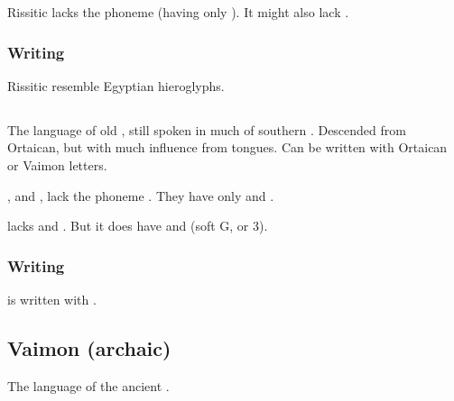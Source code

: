 Rissitic lacks the phoneme \txipa{[x]} (having only \txipa{[\c c]}). 
It might also lack \txipa{[l]}. 










\subsubsection{Writing}
Rissitic  resemble Egyptian hieroglyphs. 









\subsection{\Tepharin}
The language of old \Tephar, still spoken in much of southern \Velcad. 
Descended from Ortaican, but with much influence from \human{} tongues. 
Can be written with Ortaican or Vaimon letters. 

\Tepharin, and \Ortaican, lack the phoneme \txipa{[v]}. 
They have only \txipa{[w]} and \txipa{[hw]}. 

\Tepharin{} lacks \txipa{[z]} and \txipa{[S]}.
But it does have \txipa{[D]} and \txipa{[3]} (soft G, or 3). 










\subsubsection{Writing}
\Tepharin{} is written with . 









\subsection{Vaimon (archaic)}
The language of the ancient . 





